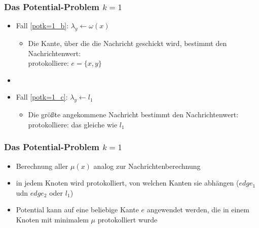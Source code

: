 \documentclass{beamer}
\begin{document}
	\begin{frame}
		\frametitle{Das Potential-Problem $k=1$}
		\large
		
		\begin{itemize}
			\item Fall \ref{potk=1_b}: $\lambda_{y} \gets \omega(x)$
			
				\begin{itemize}
					\item[ ] Die Kante, über die die Nachricht geschickt wird, bestimmt den Nachrichtenwert:\\
					protokolliere: $e=\{x, y\}$
				\end{itemize}
			
			\item[ ]
			\item Fall \ref{potk=1_c}: $\lambda_{y} \gets l_{1}$
			
				\begin{itemize}
					\item[ ] Die größte angekommene Nachricht bestimmt den Nachrichtenwert:\\
					protokolliere: das gleiche wie $l_{1}$
				\end{itemize}
			
			
		\end{itemize}
		
	\end{frame}
	
	\begin{frame}
		\frametitle{Das Potential-Problem $k=1$}
		\large
		
		\begin{itemize}
			\item Berechnung aller $\mu(x)$ analog zur Nachrichtenberechnung
			
			\item in jedem Knoten wird protokolliert, von welchen Kanten sie abhängen ($edge_{1}$ udn $edge_{2}$ oder $l_{1}$)
			
			\item Potential kann auf eine beliebige Kante $e$ angewendet werden, die in einem Knoten mit minimalem $\mu$ protokolliert wurde
			
			
		\end{itemize}
		
	\end{frame}
	
\end{document}
